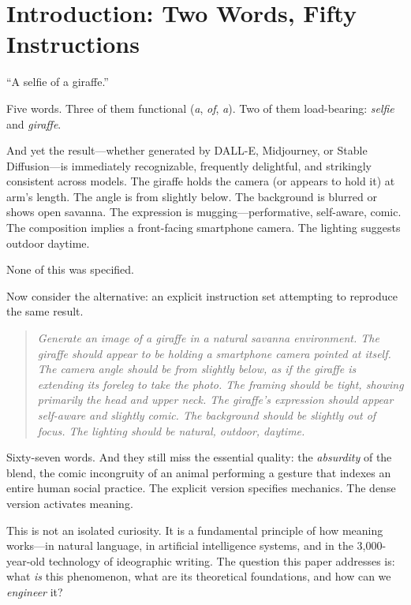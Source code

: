 \documentclass[12pt,a4paper]{article}
\begin{document}
\newpage
\tableofcontents
\newpage

\section{Introduction: Two Words, Fifty Instructions}
\label{sec:introduction}

``A selfie of a giraffe.''

Five words.
Three of them functional (\textit{a}, \textit{of}, \textit{a}).
Two of them load-bearing: \textit{selfie} and \textit{giraffe}.

And yet the result---whether generated by DALL-E, Midjourney, or Stable Diffusion---is immediately recognizable, frequently delightful, and strikingly consistent across models.
The giraffe holds the camera (or appears to hold it) at arm's length.
The angle is from slightly below.
The background is blurred or shows open savanna.
The expression is mugging---performative, self-aware, comic.
The composition implies a front-facing smartphone camera.
The lighting suggests outdoor daytime.

None of this was specified.

Now consider the alternative: an explicit instruction set attempting to reproduce the same result.

\begin{quote}
\textit{Generate an image of a giraffe in a natural savanna environment. The giraffe should appear to be holding a smartphone camera pointed at itself. The camera angle should be from slightly below, as if the giraffe is extending its foreleg to take the photo. The framing should be tight, showing primarily the head and upper neck. The giraffe's expression should appear self-aware and slightly comic. The background should be slightly out of focus. The lighting should be natural, outdoor, daytime.}
\end{quote}

Sixty-seven words.
And they still miss the essential quality: the \textit{absurdity} of the blend, the comic incongruity of an animal performing a gesture that indexes an entire human social practice.
The explicit version specifies mechanics.
The dense version activates meaning.

This is not an isolated curiosity.
It is a fundamental principle of how meaning works---in natural language, in artificial intelligence systems, and in the 3,000-year-old technology of ideographic writing.
The question this paper addresses is: what \textit{is} this phenomenon, what are its theoretical foundations, and how can we \textit{engineer} it?
\end{document}
